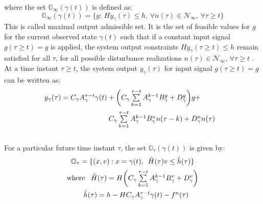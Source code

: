 \documentclass[letterpaper, 10 pt, conference]{ieeeconf}  %
\begin{document}
	where the set $\mathbb{O}_{\infty}(\gamma(t))$ is defined as:
	\begin{equation}
	\mathbb{O}_{\infty}(\gamma(t)) = \{g: \hspace{2pt} Hy_{\gamma}(\tau) \leq h ,\hspace{2pt} \forall n(\tau) \in \mathcal{N}_{\infty} ,\hspace{2pt} \forall \tau \geq t \} 
	\label{O_infty}
	\end{equation}
	This is called maximal output admissible set.
	It is the set of feasible values for $g$ for the current observed state $\gamma(t)$ such that if a constant input signal $g(\tau \geq t)=g$ is applied, the system output constraints $Hy_{\gamma}(\tau \geq t) \leq h$ remain satisfied for all $\tau$, for all possible disturbance realizations $n(\tau) \in \mathcal{N}_{\infty}$, $\forall \tau \geq t$ .
	At a time instant $\tau \geq t$, the system output $y_{\gamma}(\tau)$ for input signal $g(\tau \geq t)=g$ can be written as:
	\begin{equation*}
	\hspace{-30pt}
	\begin{aligned}
	\begin{matrix}
	y_{\gamma}(\tau) = C_{\gamma}A_{\gamma}^{\tau - t}\gamma(t) + \bigg( C_{\gamma}\sum\limits_{k=1}^{\tau - t}A_{\gamma}^{k-1}B^g_{\gamma} + D_{\gamma}^g \bigg)g + \vspace{5pt}\\  \hspace{110pt} C_{\gamma}\sum\limits_{k=1}^{\tau - t}A_{\gamma}^{k-1}B^n_{\gamma}n(\tau-k) + D_{\gamma}^n n(\tau)
	\end{matrix}
	\end{aligned}
	\end{equation*} \\
	For a particular future time instant $\tau$, the set $\mathbb{O}_{\tau}(\gamma(t))$ is given by:
	\begin{equation*}
	\begin{matrix}
	\mathbb{O}_{\tau} = \{(x,v): x = \gamma(t), \hspace{5pt} \tilde{H}(\tau)v \leq \tilde{h}(\tau)\} \vspace{5pt}\\
	\text{where } \hspace{5pt} \tilde{H}(\tau) = H\bigg( C_{\gamma}\sum\limits_{k=1}^{\tau - t}A_{\gamma}^{k-1}B^v_{\gamma} + D_{\gamma}^v \bigg) \vspace{5pt} \\ \hspace{10pt}
	\tilde{h}(\tau) = h - HC_{\gamma}A_{\gamma}^{\tau - t}\gamma(t) - f^n(\tau) \vspace{5pt}
	\end{matrix} 
	\end{equation*}
\end{document}
